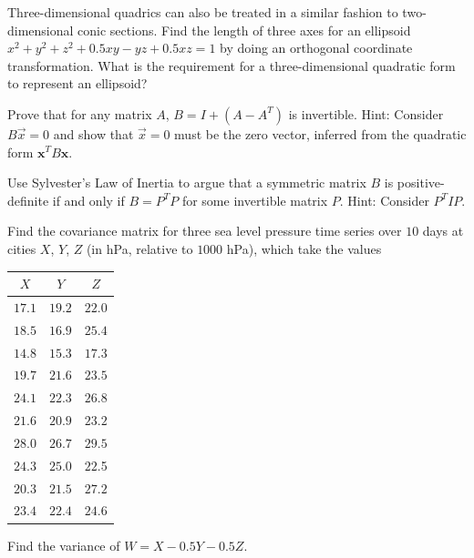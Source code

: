 \begin{Exercise}
\label{ex:ellipsoid}
Three-dimensional quadrics can also be treated in a similar fashion to two-dimensional conic sections. Find the length of three axes for an ellipsoid $x^2 + y^2 + z^2 + 0.5xy - yz + 0.5xz = 1$ by doing an orthogonal coordinate transformation. What is the requirement for a three-dimensional quadratic form to represent an ellipsoid?
\end{Exercise}

\begin{Exercise}
Prove that for any matrix $A$, $B = I + (A - A^T)$ is invertible. Hint: Consider $B\vec{x} = 0$ and show that $\vec{x} = 0$ must be the zero vector, inferred from the quadratic form $\textbf{x}^TB\textbf{x}$.
\end{Exercise}

\begin{Exercise}
\label{ex:sylvesterdefinite}
Use Sylvester's Law of Inertia to argue that a symmetric matrix $B$ is positive-definite if and only if $B = P^TP$ for some invertible matrix $P$. Hint: Consider $P^T IP$.
\end{Exercise}

\begin{Exercise}
Find the covariance matrix for three sea level pressure time series over $10$ days at cities $X$, $Y$, $Z$ (in hPa, relative to $1000$ hPa), which take the values
\begin{center}
\begin{tabular}{|c|c|c|}
\hline
$X$ & $Y$ & $Z$ \\
\hline
$17.1$ & $19.2$ & $22.0$ \\
\hline
$18.5$ & $16.9$ & $25.4$ \\
\hline
$14.8$ & $15.3$ & $17.3$ \\
\hline
$19.7$ & $21.6$ & $23.5$ \\
\hline
$24.1$ & $22.3$ & $26.8$ \\
\hline
$21.6$ & $20.9$ & $23.2$ \\
\hline 
$28.0$ & $26.7$ & $29.5$ \\
\hline
$24.3$ & $25.0$ & $22.$5 \\
\hline
$20.3$ & $21.5$ & $27.2$ \\
\hline
$23.4$ & $22.4$ & $24.6$ \\
\hline
\end{tabular}
\end{center}
Find the variance of $W = X - 0.5Y - 0.5Z$.
\end{Exercise}


